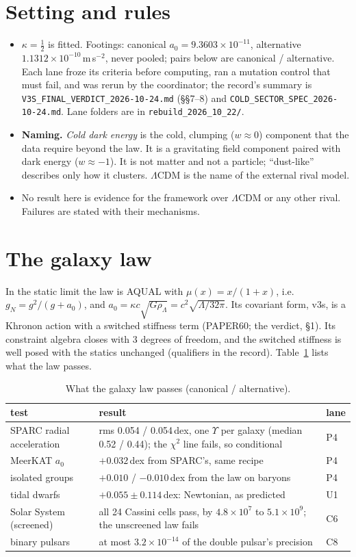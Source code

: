 \documentclass[10pt]{article}
\begin{document}
\section{Setting and rules}
\begin{itemize}
\item $\kappa=\tfrac12$ is fitted. Footings: canonical $a_0=9.3603\times10^{-11}$, alternative $1.1312\times10^{-10}$\,m\,s$^{-2}$, never pooled; pairs below are canonical / alternative. Each lane froze its criteria before computing, ran a mutation control that must fail, and was rerun by the coordinator; the record's summary is \texttt{V3S\_FINAL\_VERDICT\_2026-10-24.md} (\S\S7--8) and \texttt{COLD\_SECTOR\_SPEC\_2026-10-24.md}. Lane folders are in \texttt{rebuild\_2026\_10\_22/}.
\item \textbf{Naming.} \emph{Cold dark energy} is the cold, clumping ($w\approx0$) component that the data require beyond the law. It is a gravitating field component paired with dark energy ($w\approx-1$). It is not matter and not a particle; ``dust-like'' describes only how it clusters. $\Lambda$CDM is the name of the external rival model.
\item No result here is evidence for the framework over $\Lambda$CDM or any other rival. Failures are stated with their mechanisms.
\end{itemize}

\section{The galaxy law}
In the static limit the law is AQUAL with $\mu(x)=x/(1+x)$, i.e.\ $g_N=g^2/(g+a_0)$, and $a_0=\kappa c\sqrt{G\rho_\Lambda}=c^2\sqrt{\Lambda/32\pi}$. Its covariant form, v3s, is a Khronon action with a switched stiffness term (PAPER60; the verdict, \S1). Its constraint algebra closes with 3 degrees of freedom, and the switched stiffness is well posed with the statics unchanged (qualifiers in the record). Table~\ref{tab:pass} lists what the law passes.

\begin{table}[h]\centering\small
\caption{What the galaxy law passes (canonical / alternative).}\label{tab:pass}
\begin{tabular}{p{}p{}l}
\toprule
test & result & lane\\
\midrule
SPARC radial acceleration & rms 0.054 / 0.054\,dex, one $\Upsilon$ per galaxy (median 0.52 / 0.44); the $\chi^2$ line fails, so conditional & P4\\
MeerKAT $a_0$ & $+0.032$\,dex from SPARC's, same recipe & P4\\
isolated groups & $+0.010$ / $-0.010$\,dex from the law on baryons & P4\\
tidal dwarfs & $+0.055\pm0.114$\,dex: Newtonian, as predicted & U1\\
Solar System (screened) & all 24 Cassini cells pass, by $4.8\times10^{7}$ to $5.1\times10^{9}$; the unscreened law fails & C6\\
binary pulsars & at most $3.2\times10^{-14}$ of the double pulsar's precision & C8\\
\bottomrule
\end{tabular}
\end{table}
\end{document}
